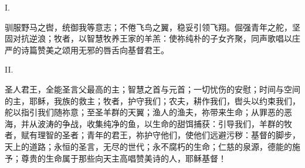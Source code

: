 I.\par

驯服野马之辔，\newline{}统御我等意志；\newline{}不倦飞鸟之翼，\newline{}稳妥引领飞翔。\newline{}倔强青年之舵，\newline{}坚固对抗逆浪；\newline{}牧者，以智慧牧养\newline{}王家的羊羔：\newline{}使祢纯朴的子女齐聚，\newline{}同声歌唱\newline{}以庄严的诗篇\newline{}赞美之颂\newline{}用无邪的唇舌向基督君王。\par

II.\par

圣人君王，全能圣言\newline{}父最高的主；\newline{}智慧之首与元首；\newline{}一切忧伤的安慰；\newline{}时间与空间的主，\newline{}耶稣，我族的救主；\newline{}牧者，护守我们；\newline{}农夫，耕作我们，\newline{}辔头以约束我们，舵\newline{}以指引我们随祢意；\newline{}至圣羊群的天翼；\newline{}渔人的渔夫，祢带来生命；\newline{}从罪恶的恶海，\newline{}并从波涛的争战，\newline{}收集纯净的鱼，\newline{}以生命的甜饵捕获：\newline{}引导我们，羊群的牧者，\newline{}赋有理智的圣者；\newline{}青年的君王，祢护守他们，\newline{}使他们远避污秽：\newline{}基督的脚步，天上的道路；\newline{}永恒的圣言，无尽的世代；\newline{}永不腐朽的生命；\newline{}仁慈的泉源，德能的施予；\newline{}尊贵的生命属于那些向天主\newline{}高唱赞美诗的人，\newline{}耶稣基督！\par

